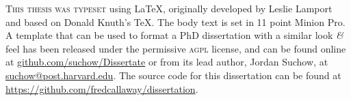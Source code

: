 \newpage

\vspace*{200pt}

\begin{center}
\parbox{200pt}{\lettrine[lines=3,slope=-2pt,nindent=-4pt]{\textcolor{SchoolColor}{T}}{his thesis was typeset} using \LaTeX, originally developed by Leslie Lamport and based on Donald Knuth's \TeX. The body text is set in 11 point Minion Pro. A template that can be used to format a PhD dissertation with a similar look \textit{\&} feel has been released under the permissive \textsc{agpl} license, and can be found online at \href{https://github.com/suchow/Dissertate}{github.com/suchow/Dissertate} or from its lead author, Jordan Suchow, at \href{mailto:suchow@post.harvard.edu}{suchow@post.harvard.edu}. The source code for this dissertation can be found at \url{https://github.com/fredcallaway/dissertation}.
} 
\end{center}
